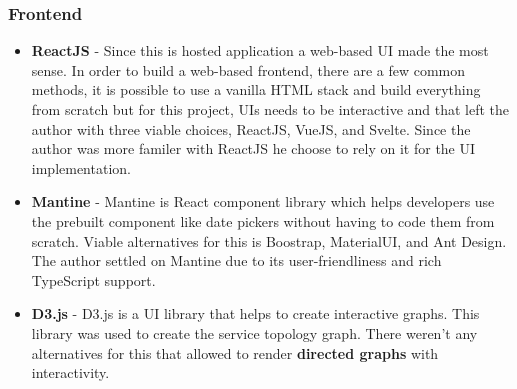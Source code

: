 \subsubsection{Frontend}
\begin{itemize}
    \item \textbf{ReactJS} - Since this is hosted application a web-based UI made the most sense. In order to build a web-based frontend, there are a few common methods, it is possible to use a vanilla HTML stack and build everything from scratch but for this project, UIs needs to be interactive and that left the author with three viable choices, ReactJS, VueJS, and Svelte. Since the author was more familer with ReactJS he choose to rely on it for the UI implementation.
    \item \textbf{Mantine} - Mantine is React component library which helps developers use the prebuilt component like date pickers without having to code them from scratch. Viable alternatives for this is Boostrap, MaterialUI, and Ant Design. The author settled on Mantine due to its user-friendliness and rich TypeScript support.
    \item \textbf{D3.js} - D3.js is a UI library that helps to create interactive graphs. This library was used to create the service topology graph. There weren't any alternatives for this that allowed to render \textbf{directed graphs} with interactivity.
\end{itemize}


